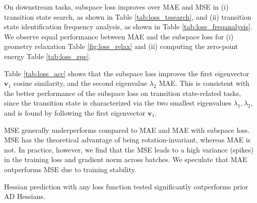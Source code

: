 \documentclass[pdflatex,sn-mathphys-num]{sn-jnl}%
\theoremstyle{thmstyleone}%
\theoremstyle{thmstyletwo}%
\theoremstyle{thmstylethree}%
\begin{document}
\begin{appendices}
On downstream tasks, subspace loss improves over MAE and MSE in (i) transition state search, as shown in Table \ref{tab:loss_tssearch}, and (ii) transition state identification frequency analysis, as shown in Table \ref{tab:loss_freqanalysis}. We observe equal performance between MAE and the subspace loss for (i) geometry relaxation Table \ref{fig:loss_relax} and (ii) computing the zero-point energy Table \ref{tab:loss_zpe}.

Table \ref{tab:loss_acc} shows that the subspace loss improves the first eigenvector $\bm{v}_1$ cosine similarity, and the second eigenvalue $\lambda_2$ MAE. This is consistent with the better performance of the subspace loss on transition state-related tasks, since the transition state is characterized via the two smallest eigenvalues $\lambda_1, \lambda_2$, and is found by following the first eigenvector $\bm{v}_1$.

MSE generally underperforms compared to MAE and MAE with subspace loss.
MSE has the theoretical advantage of being rotation-invariant, whereas MAE is not.
In practice, however, we find that the MSE leads to a high variance (spikes) in the training loss and gradient norm across batches. We speculate that MAE outperforms MSE due to training stability.

Hessian prediction with any loss function tested significantly outperforms prior AD Hessians.


\end{appendices}
\end{document}
